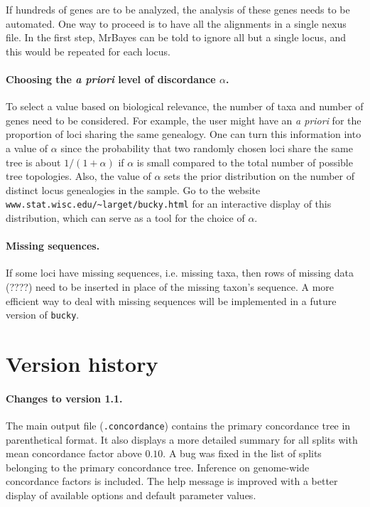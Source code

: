 \documentclass[12pt,english,final,letterpaper]{article}
\begin{document}
If hundreds of genes are to be analyzed, the analysis of these
genes needs to be automated. One way to proceed is to have 
all the alignments in a single nexus file. In the first step, MrBayes 
can be told to ignore all but a single locus, and this would be repeated 
for each locus.

\paragraph{Choosing the {\it a priori} level of discordance $\alpha$.}
To select a value based on biological relevance, the number of taxa and 
number of genes need to be considered. For example, the user might have an 
{\it a priori} for the proportion of loci sharing the same genealogy. One 
can turn this information into a value of $\alpha$ since the probability that 
two randomly chosen loci share the same tree is about $1/(1+\alpha)$ if 
$\alpha$ is small compared to the total number of possible tree topologies. 
Also, the value of $\alpha$ sets the prior distribution on the number of 
distinct locus genealogies in the sample. 
Go to the website \verb+www.stat.wisc.edu/~larget/bucky.html+ 
for an interactive display of this distribution, which can
serve as a tool for the choice of $\alpha$. 


\paragraph{Missing sequences.}
If some loci have missing sequences, i.e. missing taxa, then
rows of missing data (????) need to be inserted in place of the missing 
taxon's sequence. A more efficient way to deal with missing 
sequences will be implemented in a future version of {\tt bucky}.

    
\section{Version history}
\paragraph{Changes to version 1.1.}
The main output file ({\tt .concordance}) contains the primary concordance
tree in parenthetical format. It also displays a more detailed summary
for all splits with mean concordance factor above $0.10$. 
A bug was fixed in the list of splits belonging to the
primary concordance tree. Inference on genome-wide concordance factors is
included.
The help message is improved with a better display of available options and
default parameter values.
\end{document}
